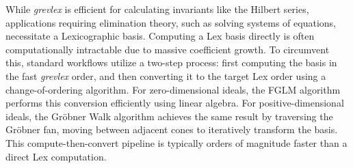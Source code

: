 While \textit{grevlex} is efficient for calculating invariants like the Hilbert series, applications requiring elimination theory, such as solving systems of equations, necessitate a Lexicographic basis. Computing a Lex basis directly is often computationally intractable due to massive coefficient growth. To circumvent this, standard workflows utilize a two-step process: first computing the basis in the fast \textit{grevlex} order, and then converting it to the target Lex order using a change-of-ordering algorithm. For zero-dimensional ideals, the FGLM algorithm \cite{Faugere1993_FGLM, Gerdt2003_ImplementationFGLM} performs this conversion efficiently using linear algebra. For positive-dimensional ideals, the Gröbner Walk algorithm \cite{Collart1997_walk, Amrhein1997_OnTheWalk, Fukuda2005_groebnerwalk, Tran2000_FastAlgorithmForGBConversion} achieves the same result by traversing the Gröbner fan, moving between adjacent cones to iteratively transform the basis. This compute-then-convert pipeline is typically orders of magnitude faster than a direct Lex computation.